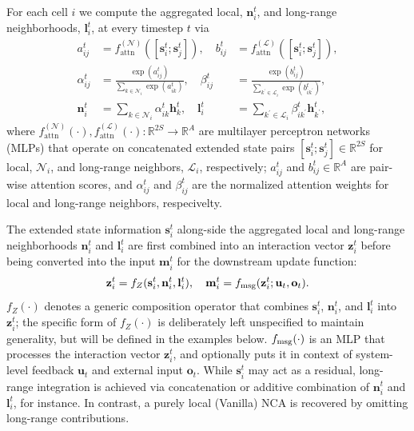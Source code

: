 \documentclass[letterpaper]{article}
\newcommand{\bh}[1]{{\color{black}#1}}  %
\begin{document}
\bh{
For each cell $i$ we compute the aggregated local, $\mathbf{n}_i^t$, and long-range neighborhoods, $\mathbf{l}_i^t$, at every timestep $t$ via
\begin{eqnarray}
a_{ij}^t &= f_{\text{attn}}^{(\mathcal{N})}([\mathbf{s}_i^t;\mathbf{s}_j^t]), \quad
b_{ij}^t &= f_{\text{attn}}^{(\mathcal{L})}([\mathbf{s}_i^t;\mathbf{s}_j^t]), \label{eq:state:attention:map}\\
\alpha_{ij}^t &= \frac{\exp(a_{ij}^t)}{\sum_{k \in \mathcal{N}_i}\exp(a_{ik}^t)}, \quad
\beta_{ij}^t &= \frac{\exp(b_{ij}^t)}{\sum_{k^\prime \in \mathcal{L}_i}\exp(b_{ik^\prime}^t)}, \label{eq:state:attention:normalized} \\
\mathbf{n}_i^t &= \sum_{k \in \mathcal{N}_i} \alpha_{ik}^t \mathbf{h}_k^t, \quad
\mathbf{l}_i^t &= \sum_{k^\prime \in \mathcal{L}_i} \beta_{ik^\prime}^t \mathbf{h}_{k^\prime}^t, \label{eq:state:attention:aggregation}
\end{eqnarray}
where $f_{\text{attn}}^{(\mathcal{N})}(\cdot),f_{\text{attn}}^{(\mathcal{L})}(\cdot):\mathbb{R}^{2S}\rightarrow \mathbb{R}^A$ are multilayer perceptron networks (MLPs) that operate on concatenated extended state pairs $[\mathbf{s}_i^t; \mathbf{s}_j^t]\in\mathbb{R}^{2S}$ for local, $\mathcal{N}_i$, and long-range neighbors, $\mathcal{L}_i$, respectively; 
$a_{ij}^t$ and $b_{ij}^t\in\mathbb{R}^A$ are pair-wise attention scores,
and $\alpha_{ij}^t$ and $\beta_{ij}^t$ are the normalized attention weights for local and long-range neighbors, respecivelty.
}

\bh{
The extended state information $\mathbf{s}_i^t$ along-side the aggregated local and long-range neighborhoods $\mathbf{n}_i^t$ and $\mathbf{l}_i^t$ are first combined into an interaction vector $\mathbf{z}_i^t$ before being converted into the input $\mathbf{m}_i^t$ for the downstream update function:
\begin{equation}
    \mathbf{z}_i^t = f_Z(\mathbf{s}_i^t, \mathbf{n}_i^t, \mathbf{l}_i^t),\quad
    \mathbf{m}_i^t = f_{\textnormal{msg}}(\mathbf{z}_i^t; \mathbf{u}_t, \mathbf{o}_t).
    \label{eq:state:composition}
\end{equation}
$f_Z(\cdot)$ denotes a generic composition operator that combines  $\mathbf{s}_i^t$, $\mathbf{n}_i^t$, and $\mathbf{l}_i^t$ into $\mathbf{z}_i^t$; the specific form of $f_Z(\cdot)$ is deliberately left unspecified to maintain generality, but will be defined in the examples below.
$f_{\textnormal{msg}}(\cdot)$ is an MLP that processes the interaction vector $\mathbf{z}_i^t$, and optionally puts it in context of system-level feedback $\mathbf{u}_t$ and external input $\mathbf{o}_t$.  
While $\mathbf{s}_i^t$ may act as a residual, long-range integration is achieved via concatenation or additive combination of $\mathbf{n}_i^t$ and $\mathbf{l}_i^t$, for instance. 
In contrast, a purely local (Vanilla) NCA is recovered by omitting long-range contributions.
}
\end{document}
